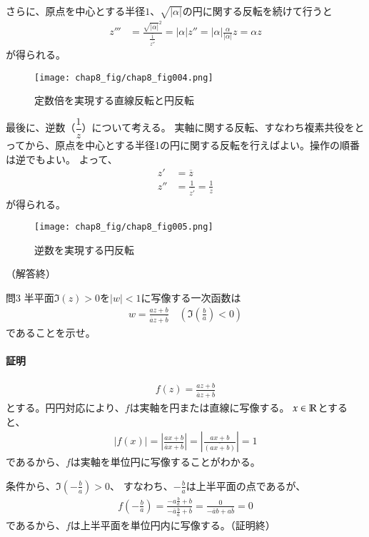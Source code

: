 さらに、原点を中心とする半径$1$、$\sqrt{|\alpha|}$の円に関する反転を続けて行うと
\begin{align*}
    z'''&=\frac{\sqrt{|\alpha|}^2}{\overline{\frac{1}{\overline{z''}}}}
    =|\alpha|z''
    =|\alpha|\frac{\alpha}{|\alpha|}z
    =\alpha z
\end{align*}
が得られる。
\begin{figure}[h]
    \centering
    \texttt{[image: chap8\_fig/chap8\_fig004.png]}
    \caption{定数倍を実現する直線反転と円反転}
    \label{fig:chap8_mult}
\end{figure}

\newpage
最後に、逆数（$\dfrac{1}{z}$）について考える。
実軸に関する反転、すなわち複素共役をとってから、原点を中心とする半径1の円に関する反転を行えばよい。操作の順番は逆でもよい。
よって、
\begin{align*}
    z'&=\overline{z}\\
    z''&=\frac{1}{\overline{z'}}=\frac{1}{z}
\end{align*}
が得られる。
\begin{figure}[h]
    \centering
    \texttt{[image: chap8\_fig/chap8\_fig005.png]}
    \caption{逆数を実現する円反転}
    \label{fig:chap8_inverse}
\end{figure}
（解答終）



\newpage
\begin{mysimplebox}{問3}
    半平面$\Im(z)>0$を$|w|<1$に写像する一次函数は
    \begin{align*}
        w=\frac{az+b}{\overline{a}z+\overline{b}}
        \quad\left(\Im\left(\frac{b}{a}\right)<0\right)
    \end{align*}
    であることを示せ。
\end{mysimplebox}
\paragraph{証明}
\begin{align*}
    f(z)=\frac{az+b}{\overline{a}z+\overline{b}}
\end{align*}
とする。円円対応により、$f$は実軸を円または直線に写像する。
$x\in\mathbb{R}$とすると、
\begin{align*}
    \left|f(x)\right|
    =\left|\frac{ax+b}{\overline{a}x+\overline{b}}\right|
    =\left|\frac{ax+b}{\overline{(ax+b)}}\right|
    =1
\end{align*}
であるから、$f$は実軸を単位円に写像することがわかる。

条件から、$\Im\left(-\frac{b}{a}\right)>0$、
すなわち、$-\frac{b}{a}$は上半平面の点であるが、
\begin{align*}
    f\left(-\frac{b}{a}\right)
    =\frac{-a\frac{b}{a}+b}{-\overline{a}\frac{b}{a}+\overline{b}}
    =\frac{0}{-\overline{a}b+a\overline{b}}
    =0
\end{align*}
であるから、$f$は上半平面を単位円内に写像する。（証明終）

